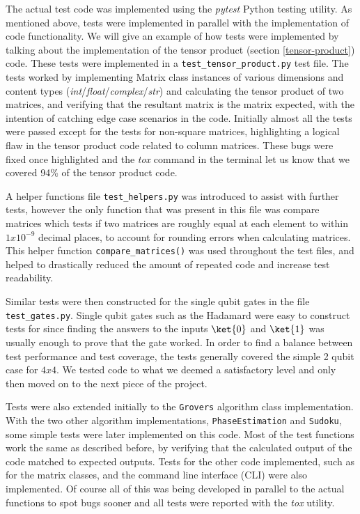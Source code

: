 \documentclass{article}
\begin{document}
The actual test code was implemented using the \textit{pytest}\cite{noauthor_pytest_nodate} Python testing utility. 
As mentioned above, tests were implemented in parallel with the implementation of code functionality.
We will give an example of how tests were implemented by talking about the implementation of the tensor product (section \ref{tensor-product}) code.
These tests were implemented in a \verb#test_tensor_product.py# test file.
The tests worked by implementing Matrix class instances of various dimensions and content types (\textit{int}/\textit{float}/\textit{complex}/\textit{str}) and calculating the tensor product of two matrices, and verifying that the resultant matrix is the matrix expected, with the intention of catching edge case scenarios in the code.
Initially almost all the tests were passed except for the tests for non-square matrices, highlighting a logical flaw in the tensor product code related to column matrices.
These bugs were fixed once highlighted and the \textit{tox} command in the terminal let us know that we covered 94\% of the tensor product code.

\medskip

A helper functions file \verb#test_helpers.py# was introduced to assist with further tests, however the only function that was present in this file was compare matrices which tests if two matrices are roughly equal at each element to within $1x10^{-9}$ decimal places, to account for rounding errors when calculating matrices.
This helper function \verb#compare_matrices()# was used throughout the test files, and helped to drastically reduced the amount of repeated code and increase test readability.

\medskip

Similar tests were then constructed for the single qubit gates in the file \verb#test_gates.py#.
Single qubit gates such as the Hadamard were easy to construct tests for since finding the answers to the inputs $\ket{0}$ and $\ket{1}$ was usually enough to prove that the gate worked.
In order to find a balance between test performance and test coverage, the tests generally covered the simple 2 qubit case for $4x4$.
We tested code to what we deemed a satisfactory level and only then moved on to the next piece of the project.

\medskip

Tests were also extended initially to the \verb#Grovers# algorithm class implementation.
With the two other algorithm implementations, \verb#PhaseEstimation# and \verb#Sudoku#, some simple tests were later implemented on this code.
Most of the test functions work the same as described before, by verifying that the calculated output of the code matched to expected outputs.
Tests for the other code implemented, such as for the matrix classes, and the command line interface (CLI) were also implemented.
Of course all of this was being developed in parallel to the actual functions to spot bugs sooner and all tests were reported with the \textit{tox} utility.
\end{document}
